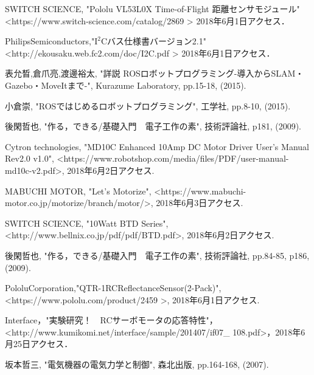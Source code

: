 \documentclass[11pt,a4j]{jarticle}
\begin{document}
\newpage


\newpage


\newpage


\newpage


\newpage



\newpage
\begin{thebibliography}{99}
  SWITCH SCIENCE, "Pololu VL53L0X Time-of-Flight 距離センサモジュール"
  \textless https://www.switch-science.com/catalog/2869 \textgreater
  2018年6月1日アクセス．
  
  Philips\quad Semiconductors,\quad "$\mathrm{I^2C}$\hspace{0.5em}バス仕様書バージョン2.1"　　　　　　　　　　
  \textless http://ekousaku.web.fc2.com/doc/I2C.pdf \textgreater
  \quad 2018年6月1日アクセス．

    表允晳,倉爪亮,渡邊裕太, "詳説 ROSロボットプログラミング-導入からSLAM・Gazebo・MoveItまで-", 
    Kurazume Laboratory, pp.15-18, (2015).

    小倉崇, "ROSではじめるロボットプログラミング", 工学社, pp.8-10, (2015).
  
  後閑哲也, "作る，できる/基礎入門　電子工作の素", 技術評論社, p181, (2009).
  
  Cytron technologies, "MD10C Enhanced 10Amp DC Motor Driver User's Manual Rev2.0 v1.0", 
  \textless https://www.robotshop.com/media/files/PDF/user-manual-md10c-v2.pdf\textgreater , 2018年6月2日アクセス.
  
  MABUCHI MOTOR, "Let's Motorize", 
  \textless https://www.mabuchi-motor.co.jp/motorize/branch/motor/\textgreater , 2018年6月3日アクセス.
  
  SWITCH SCIENCE, "10Watt BTD Series", 
  \textless http://www.bellnix.co.jp/pdf/pdf/BTD.pdf\textgreater , 2018年6月2日アクセス.
  
  後閑哲也, "作る，できる/基礎入門　電子工作の素", 技術評論社, pp.84-85, p186, (2009).
  
   Pololu\quad Corporation,\quad "QTR-1RC\quad Reflectance\quad Sensor(2-Pack)",
   \textless https://www.pololu.com/product/2459 \textgreater , 2018年6月1日アクセス.
  
  Interface，"実験研究！　RCサーボモータの応答特性"，
  \textless http://www.kumikomi.net/interface/sample/201407/if07\_ 108.pdf\textgreater ，2018年6月25日アクセス．  
  
    坂本哲三, "電気機器の電気力学と制御", 森北出版, pp.164-168, (2007).
  

\end{thebibliography}
\end{document}
